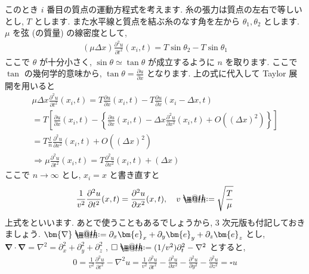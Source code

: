 \documentclass[openany, a4paper, oneside]{book}
\makeatletter
\newcommand*{\defeq}{\mathrel{\rlap{%
\raisebox{0.3ex}{$\m@th\cdot$}}%
\raisebox{-0.3ex}{$\m@th\cdot$}}%
=}
\theoremstyle{break}
\theoremstyle{breakdefn}
\makeatother
\begin{document}
このとき $i$ 番目の質点の運動方程式を考えます. 糸の張力は質点の左右で等しいとし,  $T$ とします.
また水平線と質点を結ぶ糸のなす角を左から $\theta_1,\theta_2$ とします.
$\mu$ を弦 (の質量) の線密度として,
\begin{align}
( \mu \varDelta x) \frac{\partial ^2 u} {\partial t ^2} (x_i , t )
=
T \sin \theta_2 - T \sin \theta_1
\end{align}
ここで $\theta$ が十分小さく,  $\sin \theta \simeq \tan \theta$ が成立するように $n$ を取ります.
ここで $\tan$ の幾何学的意味から,  $\tan \theta = \frac {\partial u} {\partial x}$ となります.
上の式に代入して Taylor 展開を用いると
\begin{gather}
\mu \varDelta x \frac{\partial ^2 u} {\partial t ^2} (x_i , t )
=
T \frac{\partial u} {\partial x}(x_i , t) - T \frac{\partial u} {\partial x}\left ( x_i - \varDelta x , t \right) \\
=
T \left [
\frac{\partial u} {\partial x}(x_i , t)
-\left \{
\frac{\partial u} {\partial x} ( x_i , t ) - \varDelta x \frac{\partial ^2 u} {\partial x^2} ( x_i , t )
+O \left ( \left ( \varDelta x \right) ^2 \right)
\right \}
\right ]\\
=
T \frac{l} {n} \frac{\partial ^2 u} {\partial  x ^2}(x_i , t ) + O \left ( \left ( \varDelta x \right) ^2 \right)\\
\Longrightarrow
\mu \frac{\partial ^2 u} {\partial t ^2} (x_i , t )
=
T \frac{\partial ^2 u} {\partial  x ^2}(x_i , t ) + \left ( \varDelta x \right)
\end{gather}
ここで $n \to \infty$ とし,  $x_i = x$ と書き直すと
\begin{align}
\frac{1} {v^2} \frac{\partial ^2 u} {\partial t ^2} (x , t )
=
\frac{\partial ^2 u} {\partial  x ^2}(x , t ),
\quad
v \defeq \sqrt \frac{T} {\mu}
\end{align}
上式をといいます.
あとで使うこともあるでしょうから, 3 次元版も付記しておきましょう.
$\bm{\nabla} \defeq \partial _x \bm{e} _x + \partial _y \bm{e} _y + \partial _z \bm{e} _z$ とし,
$\bm{\nabla} \cdot \bm{\nabla} = \nabla ^2 = \partial _x ^2 + \partial _y ^2 +\partial _z ^2$ ,
$\square \defeq (1/v^2) \partial _t ^2 - \nabla ^2$
とすると,
\begin{align}
0
=
\frac{1} {v^2} \frac{\partial ^2 u} {\partial t ^2}
-\nabla ^2 u
=
\frac{1} {v^2} \frac{\partial ^2 u} {\partial t ^2}
-\frac{\partial ^2 u} {\partial  x ^2}
-\frac{\partial ^2 u} {\partial y ^2}
-\frac{\partial ^2 u} {\partial  z ^2}
=
\square u
\end{align}
\end{document}
